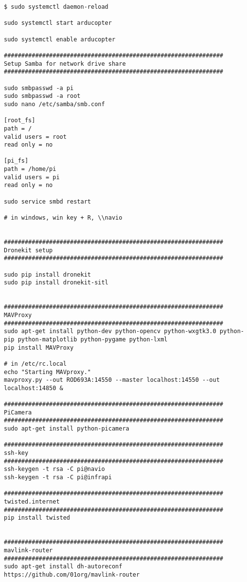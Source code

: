 \begin{appendices}
\begin{lstlisting}
$ sudo systemctl daemon-reload

sudo systemctl start arducopter

sudo systemctl enable arducopter

###############################################################
Setup Samba for network drive share
###############################################################

sudo smbpasswd -a pi
sudo smbpasswd -a root
sudo nano /etc/samba/smb.conf

[root_fs]
path = /
valid users = root
read only = no

[pi_fs]
path = /home/pi
valid users = pi
read only = no

sudo service smbd restart

# in windows, win key + R, \\navio


###############################################################
Dronekit setup
###############################################################

sudo pip install dronekit
sudo pip install dronekit-sitl


###############################################################
MAVProxy
###############################################################
sudo apt-get install python-dev python-opencv python-wxgtk3.0 python-pip python-matplotlib python-pygame python-lxml
pip install MAVProxy

# in /etc/rc.local
echo "Starting MAVproxy."
mavproxy.py --out ROD693A:14550 --master localhost:14550 --out localhost:14850 &

###############################################################
PiCamera
###############################################################
sudo apt-get install python-picamera

###############################################################
ssh-key
###############################################################
ssh-keygen -t rsa -C pi@navio
ssh-keygen -t rsa -C pi@infrapi

###############################################################
twisted.internet
###############################################################
pip install twisted


###############################################################
mavlink-router
###############################################################
sudo apt-get install dh-autoreconf
https://github.com/01org/mavlink-router




\end{lstlisting}
\end{appendices}
